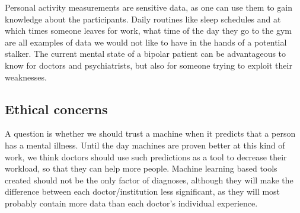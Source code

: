 Personal activity measurements are sensitive data, as one can use them to gain knowledge about the participants. Daily routines like sleep schedules and at which times someone leaves for work, what time of the day they go to the gym are all examples of data we would not like to have in the hands of a potential stalker. The current mental state of a bipolar patient can be advantageous to know for doctors and psychiatrists, but also for someone trying to exploit their weaknesses. 

\subsection{Ethical concerns}
A question is whether we should trust a machine when it predicts that a person has a mental illness. Until the day machines are proven better at this kind of work, we think doctors should use such predictions as a tool to decrease their workload, so that they can help more people. Machine learning based tools created should not be the only factor of diagnoses, although they will make the difference between each doctor/institution less significant, as they will most probably contain more data than each doctor's individual experience. 




 






 


